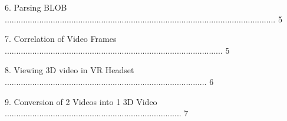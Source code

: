 \documentclass[10pt,draftclsnofoot,onecolumn]{IEEEtran}
\newcommand\tab[1][1cm]{\hspace*{#1}}
\begin{document}
\tab 6. Parsing BLOB ...................................................................................................................... 5\\
                 \vspace{2mm}

\tab 7. Correlation of Video Frames ............................................................................................... 5\\
                 \vspace{2mm}

        
\tab 8. Viewing 3D video in VR Headset ........................................................................................ 6\\
                 \vspace{2mm}
                 
\tab 9. Conversion of 2 Videos into 1 3D Video ............................................................................. 7\\
                 \vspace{2mm}
                 
\end{document}
